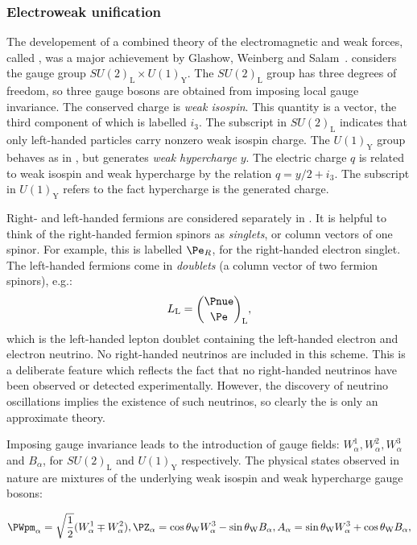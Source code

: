 \subsubsection{Electroweak unification}

The developement of a combined theory of the electromagnetic and weak forces, called \EWT, was a major achievement by Glashow, Weinberg and Salam~\cite{GlashowPartialSymmetries,WeinbergModelOfLeptons,SalamNobelSymposium}. %
\EWT considers the gauge group $SU(2)_{\textrm{L}} \times U(1)_{\textrm{Y}}$. The $SU(2)_{\textrm{L}}$ group has three degrees of freedom, so three gauge bosons are obtained from imposing local gauge invariance. The conserved charge is \emph{weak isospin}. This quantity is a vector, the third component of which is labelled $i_3$. The subscript in $SU(2)_{\textrm{L}}$ indicates that only left-handed particles carry nonzero weak isospin charge. The $U(1)_{\textrm{Y}}$ group behaves as in \QED, but generates \emph{weak hypercharge} $y$. The electric charge $q$ is related to weak isospin and weak hypercharge by the relation $q=y/2 + i_3$. The subscript in $U(1)_{\textrm{Y}}$ refers to the fact hypercharge is the generated charge.

Right- and left-handed fermions are considered separately in \EWT. It is helpful to think of the right-handed fermion spinors as \emph{singlets}, or column vectors of one spinor. For example, this is labelled $\Pe_{R}$, for the right-handed electron singlet.
The left-handed fermions come in \emph{doublets} (a column vector of two fermion spinors), e.g.:
$$
L_{\textrm{L}}=\binom{\Pnue}{\Pe}_{\textrm{L}},
$$
which is the left-handed lepton doublet containing the left-handed electron and electron neutrino. No right-handed neutrinos are included in this scheme. This is a deliberate feature which reflects the fact that no right-handed neutrinos have been observed or detected experimentally. However, the discovery of neutrino oscillations implies the existence of such neutrinos, so clearly the \SM is only an approximate theory. 

Imposing gauge invariance leads to the introduction of gauge fields: $W_{\alpha}^{1},W_{\alpha}^{2},W_{\alpha}^{3}$ and $B_{\alpha}$, for $SU(2)_{\textrm{L}}$ and $U(1)_{\textrm{Y}}$ respectively. The physical states observed in nature are mixtures of the underlying weak isospin and weak hypercharge gauge bosons:

\begin{equation}
\label{eq:th:electroweak_gauge_bosons}
\PWpm_{\alpha} = \sqrt{\frac{1}{2}}(W_{\alpha}^{1} \mp W_{\alpha}^{2}) ,\\
\PZ_{\alpha} = \cos \theta_{\textrm{W}} W_{\alpha}^{3} - \sin \theta_{\textrm{W}} B_{\alpha} ,\\
A_{\alpha} = \sin \theta_{\textrm{W}} W_{\alpha}^{3} + \cos \theta_{\textrm{W}} B_{\alpha} ,
\end{equation}

